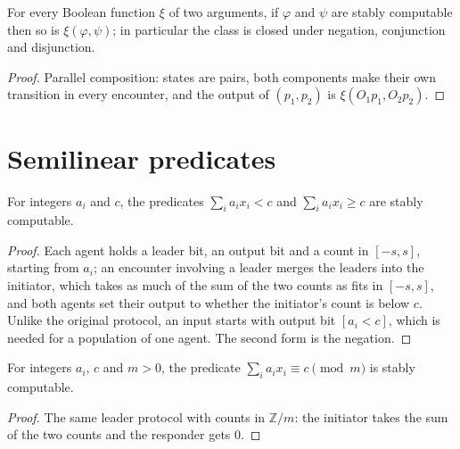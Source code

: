 \begin{theorem}\label{thm:boolean}
\leanok{}
For every Boolean function $\xi$ of two arguments, if $\varphi$ and $\psi$ are stably computable
then so is $\xi(\varphi, \psi)$; in particular the class is closed under negation, conjunction and
disjunction.
\end{theorem}
\begin{proof}\leanok
Parallel composition: states are pairs, both components make their own transition in every
encounter, and the output of $(p_1, p_2)$ is $\xi(O_1 p_1, O_2 p_2)$.
\end{proof}

\section{Semilinear predicates}
\begin{theorem}\label{thm:threshold}
\leanok{}
For integers $a_i$ and $c$, the predicates $\sum_i a_i x_i < c$ and $\sum_i a_i x_i \ge c$ are stably
computable.
\end{theorem}
\begin{proof}\leanok
Each agent holds a leader bit, an output bit and a count in $[-s, s]$, starting from $a_i$; an
encounter involving a leader merges the leaders into the initiator, which takes as much of the sum
of the two counts as fits in $[-s, s]$, and both agents set their output to whether the
initiator's count is below $c$. Unlike the original protocol, an input starts with output bit
$[a_i < c]$, which is needed for a population of one agent. The second form is the negation.
\end{proof}

\begin{theorem}\label{thm:remainder}
\leanok{}
For integers $a_i$, $c$ and $m > 0$, the predicate $\sum_i a_i x_i \equiv c \pmod m$ is stably
computable.
\end{theorem}
\begin{proof}\leanok
The same leader protocol with counts in $\mathbb{Z}/m$: the initiator takes the sum of the two
counts and the responder gets $0$.
\end{proof}

